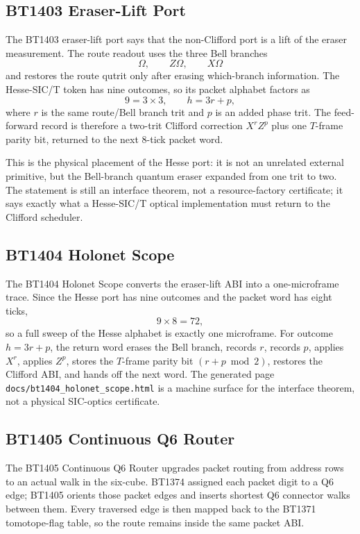 ﻿\documentclass[12pt]{article}
\begin{document}
\subsection{BT1403 Eraser-Lift Port}

The BT1403 eraser-lift port says that the non-Clifford port is a lift of the
eraser measurement.  The route readout
uses the three Bell branches
\[
\Omega,\qquad Z\Omega,\qquad X\Omega
\]
and restores the route qutrit only after erasing which-branch information.  The
Hesse-SIC/T token has nine outcomes, so its packet alphabet factors as
\[
9=3\times3,\qquad h=3r+p,
\]
where \(r\) is the same route/Bell branch trit and \(p\) is an added phase trit.
The feed-forward record is therefore a two-trit Clifford correction \(X^rZ^p\)
plus one \(T\)-frame parity bit, returned to the next 8-tick packet word.

This is the physical placement of the Hesse port: it is not an unrelated
external primitive, but the Bell-branch quantum eraser expanded from one trit to
two.  The statement is still an interface theorem, not a resource-factory
certificate; it says exactly what a Hesse-SIC/T optical implementation must
return to the Clifford scheduler.

\subsection{BT1404 Holonet Scope}

The BT1404 Holonet Scope converts the eraser-lift ABI into a one-microframe
trace.  Since the Hesse port has nine outcomes and the packet word has eight
ticks,
\[
9\times 8=72,
\]
so a full sweep of the Hesse alphabet is exactly one microframe.  For outcome
\(h=3r+p\), the return word erases the Bell branch, records \(r\), records \(p\),
applies \(X^r\), applies \(Z^p\), stores the \(T\)-frame parity bit
\((r+p\bmod 2)\), restores the Clifford ABI, and hands off the next word.
The generated page \texttt{docs/bt1404\_holonet\_scope.html} is a machine
surface for the interface theorem, not a physical SIC-optics certificate.

\subsection{BT1405 Continuous Q6 Router}

The BT1405 Continuous Q6 Router upgrades packet routing from address rows to an
actual walk in the six-cube.  BT1374 assigned each packet digit to a Q6 edge;
BT1405 orients those packet edges and inserts shortest Q6 connector walks
between them.  Every traversed edge is then mapped back to the BT1371
tomotope-flag table, so the route remains inside the same packet ABI.
\end{document}

